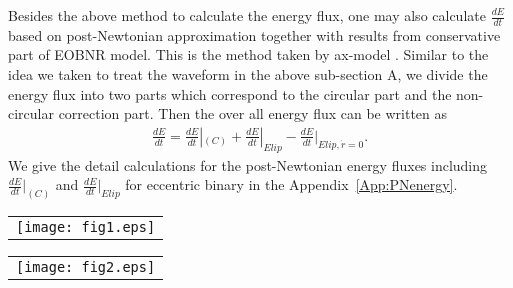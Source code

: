 \documentclass[prd,aps,a4paper,superscriptaddress,twocolumn,footinbib,showpacs]{revtex4}
\begin{document}
Besides the above method to calculate the energy flux, one may also calculate $\frac{dE}{dt}$ based on post-Newtonian approximation together with results from conservative part of EOBNR model. This is the method taken by ax-model \cite{PhysRevD.95.024038}. Similar to the idea we taken to treat the waveform in the above sub-section A, we divide the energy flux into two parts which correspond to the circular part and the non-circular correction part. Then the over all energy flux can be written as
\begin{align}
\frac{dE}{dt}=\frac{dE}{dt}|_{(C)}+\frac{dE}{dt}|_{Elip}-\frac{dE}{dt}|_{Elip,\dot{r}=0}.\label{energyflux}
\end{align}
We give the detail calculations for the post-Newtonian energy fluxes including $\frac{dE}{dt}|_{(C)}$ and $\frac{dE}{dt}|_{Elip}$ for eccentric binary in the Appendix~\ref{App:PNenergy}.
\begin{figure*}
\begin{tabular}{c}
\texttt{[image: fig1.eps]}
\end{tabular}
\caption{Test for two identical spinless black holes with eccentricity $e_0=0$. The four top panels are comparison of ($\ell=2,m=2$) mode of the gravitational wave form for SEOBNRE and SEOBNRv1. The bottom two panels are comparison of energy flux for the one generated with waveform (\ref{waveformflux}), $-\frac{dE}{dt}$ given in (\ref{energyflux}) and $-\frac{dE}{dt}|_{(C)}$ in (\ref{energyfluxwo}). In the plot the energy flux generated with waveform (\ref{waveformflux}) is marked with `flux based on waveform'. The $-\frac{dE}{dt}$ given in (\ref{energyflux}) is marked with `with elliptic correction'. The $-\frac{dE}{dt}|_{(C)}$ in (\ref{energyfluxwo}) is marked with `without elliptic correction'. SEOBNRE model is used in the energy flux comparison.}\label{fig1}
\end{figure*}

\begin{figure*}
\begin{tabular}{c}
\texttt{[image: fig2.eps]}
\end{tabular}
\caption{Quantitative comparison of waveform $h_{22}$ corresponding to Fig.~\ref{fig1}. In the plot $\Delta |h_{22}R/M|\equiv \text{abs}(|h_{22,\text{SEOBNRE}}R/M| - |h_{22,\text{SEOBNRv1}}R/M|)$, $\Delta (\text{phase of }h_{22})\equiv\text{abs}(\text{phase of }h_{22,\text{SEOBNRE}}-\text{phase of }h_{22,\text{SEOBNRv1}})$.}\label{fig2}
\end{figure*}
\end{document}
